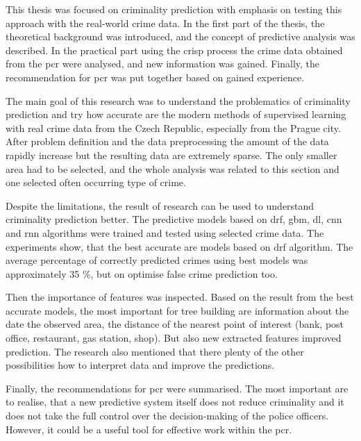 \documentclass[thesis=M,english]{FITthesis}[2012/10/20]
\begin{document}
\begin{conclusion}
    
    This thesis was focused on criminality prediction with emphasis on testing this approach with the real-world crime data. In the first part of the thesis, the theoretical background was introduced, and the concept of predictive analysis was described. In the practical part using the \gls{crisp} process the crime data obtained from the \gls{pcr} were analysed, and new information was gained. Finally, the recommendation for \gls{pcr} was put together based on gained experience. 
    
    The main goal of this research was to understand the problematics of criminality prediction and try how accurate are the modern methods of supervised learning with real crime data from the Czech Republic, especially from the Prague city. After problem definition and the data preprocessing the amount of the data rapidly increase but the resulting data are extremely sparse. The only smaller area had to be selected, and the whole analysis was related to this section and one selected often occurring type of crime. 
    
    Despite the limitations, the result of research can be used to understand criminality prediction better. The predictive models based on \gls{drf}, \gls{gbm}, \gls{dl}, \gls{cnn} and \gls{rnn} algorithms were trained and tested using selected crime data. The experiments show, that the best accurate are models based on \gls{drf} algorithm. The average percentage of correctly predicted crimes using best models was approximately 35 \%, but on optimise false crime prediction too. 
    
    Then the importance of features was inspected. Based on the result from the best accurate models, the most important for tree building are information about the date the observed area, the distance of the nearest point of interest (bank, post office, restaurant, gas station, shop). But also new extracted features improved prediction. The research also mentioned that there plenty of the other possibilities how to interpret data and improve the predictions.  
    
    Finally, the recommendations for \gls{pcr} were summarised. The most important are to realise, that a new predictive system itself does not reduce criminality and it does not take the full control over the decision-making of the police officers. However, it could be a useful tool for effective work within the \gls{pcr}. 
    

\end{conclusion}
\end{document}
